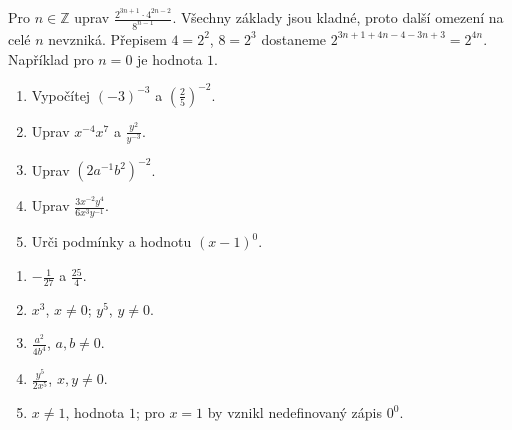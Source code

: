 \documentclass[11pt,a4paper]{article}
\begin{document}

\begin{prikladReseniBox}[title={Rozšíření procvičení},breakable=false]
Pro $n\in\mathbb Z$ uprav $\frac{2^{3n+1}\cdot4^{2n-2}}{8^{n-1}}$.
\tcblower
Všechny základy jsou kladné, proto další omezení na celé $n$ nevzniká. Přepisem $4=2^2$, $8=2^3$ dostaneme $2^{3n+1+4n-4-3n+3}=2^{4n}$. Například pro $n=0$ je hodnota $1$.
\end{prikladReseniBox}





\begin{zadaniReseniBox}[title={Domácí úlohy},breakable=false]
\begin{enumerate}[label=\alph*)]
\item Vypočítej $(-3)^{-3}$ a $(\tfrac25)^{-2}$.
\item Uprav $x^{-4}x^7$ a $\frac{y^2}{y^{-3}}$.
\item Uprav $(2a^{-1}b^2)^{-2}$.
\item Uprav $\frac{3x^{-2}y^4}{6x^3y^{-1}}$.
\item Urči podmínky a hodnotu $(x-1)^0$.
\end{enumerate}
\tcblower
\begin{enumerate}[label=\alph*)]
\item $-\frac1{27}$ a $\frac{25}{4}$.
\item $x^3$, $x\ne0$; $y^5$, $y\ne0$.
\item $\frac{a^2}{4b^4}$, $a,b\ne0$.
\item $\frac{y^5}{2x^5}$, $x,y\ne0$.
\item $x\ne1$, hodnota $1$; pro $x=1$ by vznikl nedefinovaný zápis $0^0$.
\end{enumerate}
\end{zadaniReseniBox}
\end{document}
